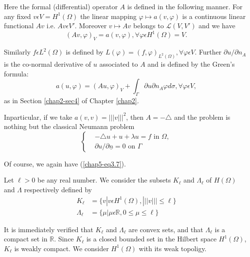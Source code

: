 Here the formal (differential) operator $A$ is defined in the following manner. For any fixed $v \epsilon V = H^{1} (\Omega)$ the linear mapping $\varphi \mapsto a(v, \varphi)$ is a continuous linear functional $Av$ i.e. $Av \epsilon V'$. Moreover $v \mapsto Av$ belongs to $\mathscr{L} (V, V')$ and we have
$$
(Av, \varphi)_{V} = a(v, \varphi), \forall \varphi \epsilon H^{1} (\Omega) = V.
$$

Similarly $f \epsilon L^{2} (\Omega)$ is defined by $L(\varphi) = (f, \varphi)_{L^{2} (\Omega)}, \forall \varphi \epsilon V$. Further $\partial u / \partial n_{A}$ is the co-normal derivative of $u$ associated to $A$ and is defined by the Green's formula:
$$
a(u, \varphi) = (Au, \varphi)_{V} + \int_{\Gamma} \partial u \partial n_{A} \varphi d \sigma, \forall \varphi \epsilon V,
$$
as in Section \ref{chap2-sec4} of Chapter \ref{chap2}.

In\pageoriginale particular, if we take $a(v, v) = |||v|||^{2}$, then $A = - \triangle$ and the problem is nothing but the classical Neumann problem
\begin{equation*}
\begin{cases}
& -\triangle u + u + \lambda u = f \text{ in } \Omega,\\
& \partial u / \partial \underline{n} = 0 \text{ on } \Gamma\tag*{$(3.6)'$}\label{chap5-eq3.6'}
\end{cases}
\end{equation*}

Of course, we again have (\ref{chap5-eq3.7}).

\medskip
{} Let $\ell > 0$ be any real number. We consider the subsets $K_{\ell}$ and $\Lambda_{\ell}$ of $H(\Omega)$ and $\Lambda$ respectively defined by
\begin{align*}
K_{\ell} & = \{v | v \epsilon H^{1} (\Omega), |||v||| \leq \ell \}\\
\Lambda_{\ell} & = \{\mu | \mu \epsilon \mathbb{R}, 0 \leq \mu \leq \ell \}
\end{align*}

It is immediately verified that $K_{\ell}$ and $\Lambda_{\ell}$ are convex sets, and that $\Lambda_{\ell}$ is a compact set in $\mathbb{R}$. Since $K_{\ell}$ is a closed bounded set in the Hilbert space $H^{1} (\Omega)$, $K_{\ell}$ is weakly compact. We consider $H^{1} (\Omega)$ with its weak topoligy.

